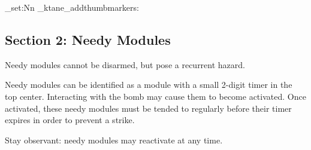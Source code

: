 \documentclass{../../ktane-mod}
\begin{document}
\ExplSyntaxOn
  \cs_set:Nn \g_ktane_addthumbmarkers: {}
\ExplSyntaxOff
{}

\clearpage
\vspace*{0.33\textheight}

\begin{center}
  \begin{minipage}{\textwidth}
    \begin{minipage}[t]{0.65\textwidth}
      \setlength{\parskip}{10pt}
      \begin{center}
        \section*{Section 2: Needy Modules}
        
        Needy modules cannot be disarmed, but pose a recurrent hazard.

        Needy modules can be identified as a module with a small 2-digit timer in the top center.
        Interacting with the bomb may cause them to become activated.
        Once activated, these needy modules must be tended to regularly before their timer expires in order to prevent a strike.

        Stay observant: needy modules may reactivate at any time.
      \end{center}
    \end{minipage}%
    \hfill%
    \begin{minipage}[t]{0.3\textwidth}
      \centering
    \end{minipage}
  \end{minipage}
\end{center}

\clearpage







\cleardoublepage
\end{document}
